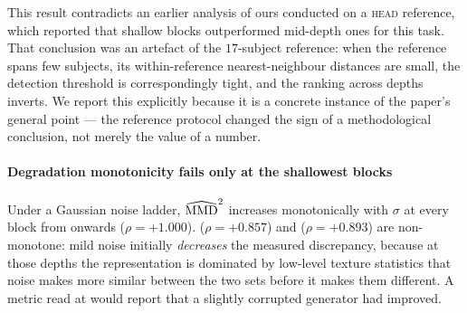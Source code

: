 This result contradicts an earlier analysis of ours conducted on a
\textsc{head} reference, which reported that shallow blocks outperformed
mid-depth ones for this task. That conclusion was an artefact of the
$17$-subject reference: when the reference spans few subjects, its
within-reference nearest-neighbour distances are small, the detection threshold
is correspondingly tight, and the ranking across depths inverts. We report this
explicitly because it is a concrete instance of the paper's general point ---
the reference protocol changed the sign of a methodological conclusion, not
merely the value of a number.

\paragraph{Degradation monotonicity fails only at the shallowest blocks}
Under a Gaussian noise ladder, $\widehat{\mathrm{MMD}}^2$ increases monotonically with
$\sigma$ at every block from  onwards ($\rho = +1.000$). 
($\rho = +0.857$) and  ($\rho = +0.893$) are non-monotone: mild noise
initially \emph{decreases} the measured discrepancy, because at those depths the
representation is dominated by low-level texture statistics that noise makes
more similar between the two sets before it makes them different. A metric read
at  would report that a slightly corrupted generator had improved.


